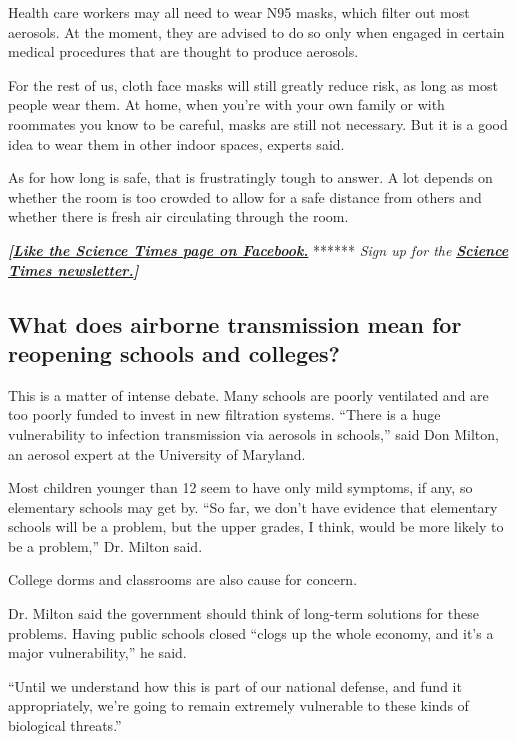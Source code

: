 Health care workers may all need to wear N95 masks, which filter out
most aerosols. At the moment, they are advised to do so only when
engaged in certain medical procedures that are thought to produce
aerosols.

For the rest of us, cloth face masks will still greatly reduce risk, as
long as most people wear them. At home, when you're with your own family
or with roommates you know to be careful, masks are still not necessary.
But it is a good idea to wear them in other indoor spaces, experts said.

As for how long is safe, that is frustratingly tough to answer. A lot
depends on whether the room is too crowded to allow for a safe distance
from others and whether there is fresh air circulating through the room.

\textbf{\emph{{[}}\href{http://on.fb.me/1paTQ1h}{\emph{Like the Science
Times page on Facebook.}}} ****** \emph{\textbar{} Sign up for the}
\textbf{\href{http://nyti.ms/1MbHaRU}{\emph{Science Times
newsletter.}}\emph{{]}}}

\hypertarget{what-does-airborne-transmission-mean-for-reopening-schools-and-colleges}{%
\subsection{What does airborne transmission mean for reopening schools
and
colleges?}\label{what-does-airborne-transmission-mean-for-reopening-schools-and-colleges}}

This is a matter of intense debate. Many schools are poorly ventilated
and are too poorly funded to invest in new filtration systems. ``There
is a huge vulnerability to infection transmission via aerosols in
schools,'' said Don Milton, an aerosol expert at the University of
Maryland.

Most children younger than 12 seem to have only mild symptoms, if any,
so elementary schools may get by. ``So far, we don't have evidence that
elementary schools will be a problem, but the upper grades, I think,
would be more likely to be a problem,'' Dr. Milton said.

College dorms and classrooms are also cause for concern.

Dr. Milton said the government should think of long-term solutions for
these problems. Having public schools closed ``clogs up the whole
economy, and it's a major vulnerability,'' he said.

``Until we understand how this is part of our national defense, and fund
it appropriately, we're going to remain extremely vulnerable to these
kinds of biological threats.''

